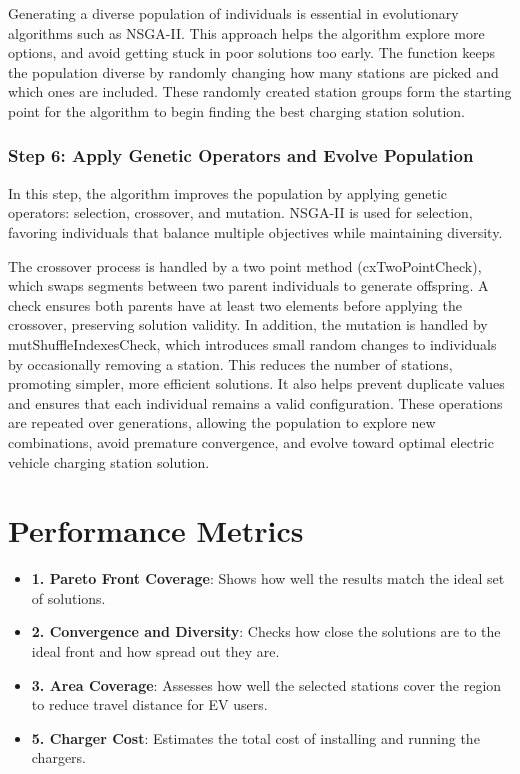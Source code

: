 Generating a diverse population of individuals is essential in evolutionary algorithms such as NSGA-II\cite{Eiben & Smith, 2003}. This approach helps the algorithm explore more options, and avoid getting stuck in poor solutions too early. The function keeps the population diverse by randomly changing how many stations are picked and which ones are included. These randomly created station groups form the starting point for the algorithm to begin finding the best charging station solution.


\subsubsection*{Step 6: Apply Genetic Operators and Evolve Population}

In this step, the algorithm improves the population by applying genetic operators: selection, crossover, and mutation. NSGA-II is used for selection, favoring individuals that balance multiple objectives while maintaining diversity\cite{A Fast and Elitist Multi-objective Genetic Algorithm: NSGA-II}. 

The crossover process is handled by a two point method (cxTwoPointCheck), which swaps segments between two parent individuals to generate offspring\cite{Introduction to evolutionary computing. Springer}. A check ensures both parents have at least two elements before applying the crossover, preserving solution validity\cite{Introduction to evolutionary computing. Springer}. 
In addition, the mutation is handled by mutShuffleIndexesCheck, which introduces small random changes to individuals by occasionally removing a station. This reduces the number of stations, promoting simpler, more efficient solutions. It also helps prevent duplicate values and ensures that each individual remains a valid configuration\cite{Introduction to evolutionary computing. Springer}. These operations are repeated over generations, allowing the population to explore new combinations, avoid premature convergence, and evolve toward optimal\cite{Introduction to evolutionary computing. Springer} electric vehicle charging station solution.


\section{Performance Metrics}


\begin{itemize}
    \item \textbf{1. Pareto Front Coverage}: Shows how well the results match the ideal set of solutions.
    \item \textbf{2. Convergence and Diversity}: Checks how close the solutions are to the ideal front and how spread out they are.
    \item \textbf{3. Area Coverage}: Assesses how well the selected stations cover the region to reduce travel distance for EV users.
    \item \textbf{5. Charger Cost}: Estimates the total cost of installing and running the chargers.
\end{itemize}



